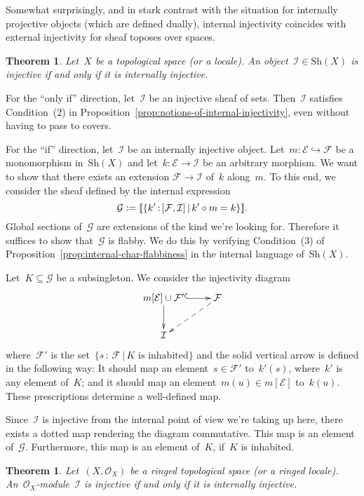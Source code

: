 \documentclass[10pt,reqno,a4paper]{amsbook}
\makeatletter
\theoremstyle{definition}
\theoremstyle{plain}
\newtheorem{thm}[defn]{Theorem}
\theoremstyle{remark}
\newcommand{\E}{\mathcal{E}}
\newcommand{\F}{\mathcal{F}}
\renewcommand{\G}{\mathcal{G}}
\renewcommand{\O}{\mathcal{O}}
\newcommand{\I}{\mathcal{I}}
\newcommand{\Sh}{\mathrm{Sh}}
\newcommand{\?}{\,{:}\,}
\renewcommand{\_}{\mathpunct{.}\,}
\newcommand{\brak}[1]{{\llbracket{#1}\rrbracket}}
\newcommand{\defeq}{\vcentcolon=}
\renewenvironment{proof}[1][\proofname]{\par
  \pushQED{\qed}%
  \normalfont \topsep6\p@\@plus6\p@\relax
  \trivlist
  \item[\hskip\labelsep
        \itshape
    #1\@addpunct{.}]\ignorespaces
}{%
  \popQED\endtrivlist\@endpefalse
}
\makeatother
\begin{document}
Somewhat surprisingly, and in stark contrast with the situation for internally
projective objects (which are defined dually), internal injectivity coincides
with external injectivity for sheaf toposes over spaces.

\begin{thm}\label{thm:char-injectivity}
Let~$X$ be a topological space (or a locale). An object~$\I \in \Sh(X)$ is
injective if and only if it is internally injective.
\end{thm}

\begin{proof}For the ``only if'' direction, let~$\I$ be an injective sheaf of
sets. Then~$\I$ satisfies Condition~(2) in
Proposition~\ref{prop:notions-of-internal-injectivity}, even without having to
pass to covers.

For the ``if'' direction, let~$\I$ be an internally injective object. Let~$m :
\E \hookrightarrow \F$ be a monomorphism in~$\Sh(X)$ and let~$k : \E \to \I$ be an arbitrary
morphism. We want to show that there exists an extension $\F \to \I$ of~$k$
along~$m$. To this end, we consider the sheaf defined by the internal expression
\[ \G \defeq \brak{\{ k' \? [\F,\I] \,|\, k' \circ m = k \}}. \]
Global sections of~$\G$ are extensions of the kind we're looking for.
Therefore it suffices to show that~$\G$ is flabby. We do this by verifying
Condition~(3) of Proposition~\ref{prop:internal-char-flabbiness} in the internal
language of~$\Sh(X)$.

Let~$K \subseteq \G$ be a subsingleton. We consider the injectivity diagram
\[ \xymatrix{
  m[\E] \cup \F' \ar@{^{(}->}[r]\ar[d] & \F \ar@{-->}[ld] \\
  \I
} \]
where~$\F'$ is the set~$\{ s \? \F \,|\, \text{$K$ is inhabited} \}$ and the solid
vertical arrow is defined in the following way: It should map an element~$s \in
\F'$ to~$k'(s)$, where~$k'$ is any element of~$K$; and it should map an
element~$m(u) \in m[\E]$ to~$k(u)$. These prescriptions determine a well-defined
map.

Since~$\I$ is injective from the internal point of view we're taking up here,
there exists a dotted map rendering the diagram commutative. This map is an
element of~$\G$. Furthermore, this map is an element of~$K$, if~$K$ is
inhabited.
\end{proof}

\begin{thm}\label{thm:char-injectivity-modules}
Let~$(X,\O_X)$ be a ringed topological space (or a ringed locale).
An~$\O_X$-module~$\I$ is injective if and only if it is internally injective.
\end{thm}
\end{document}
